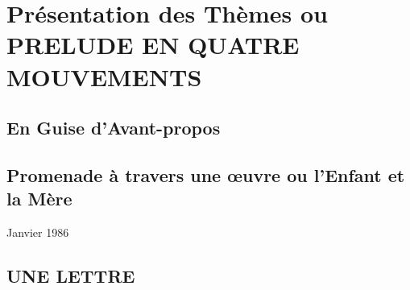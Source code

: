 \part{Présentation des Thèmes ou PRELUDE EN QUATRE MOUVEMENTS}

\chapter{En Guise d'Avant-propos}

\chapter{Promenade à travers une œuvre ou l’Enfant et la Mère}
Janvier 1986





















\chapter{UNE LETTRE}













